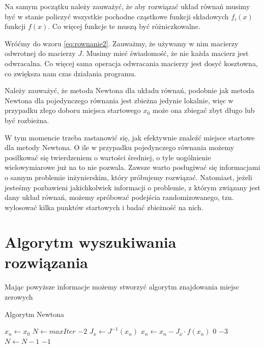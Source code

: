 \documentclass{article}
\begin{document}
    Na samym początku należy zauważyć, że aby rozwiązać układ równań musimy być w stanie
    policzyć wszystkie pochodne cząstkowe funkcji składowych $f_i(x)$ funkcji $f(x)$. Co więcej
    funkcje te muszą być różniczkowalne.

    Wróćmy do wzoru \eqref{eq:rownanie2}. Zauważmy, że używamy w nim macierzy odwrotnej
    do macierzy $J$. Musimy mieć świadomość, że nie każda macierz jest odwracalna.
    Co więcej sama operacja odwracania macierzy jest dosyć kosztowna, co zwiększa
    nam czas działania programu.

    Należy zauważyć, że metoda Newtona dla układu równań, podobnie jak
    metoda Newtona dla pojedynczego równania jest zbieżna jedynie lokalnie, więc
    w przypadku złego doboru miejsca startowego $x_0$ może ona zbiegać zbyt długo
    lub być rozbieżna.

    W tym momencie trzeba zastanowić się, jak efektywnie znaleźć miejsce startowe
    dla metody Newtona. O ile w przypadku pojedynczego równania możemy posiłkować
    się twierdzeniem o wartości średniej, o tyle uogólnienie wielowymiarowe już
    na to nie pozwala. Zawsze warto posługiwać się informacjami o samym problemie
    inżynierskim, który próbujemy rozwiązać. Natomiast, jeżeli jesteśmy pozbawieni
    jakichkolwiek informacji o problemie, z którym związany jest dany układ równań,
    możemy spróbować podejścia randomizowanego, tzn. wylosować kilka punktów startowych
    i badać zbieżność na nich.

  \section{Algorytm wyszukiwania rozwiązania}
    \paragraph{} Mając powyższe informacje możemy stworzyć algorytm znajdowania miejsc zerowych

    \begin{algorithm}
    \caption{Algorytm Newtona}\label{alg:newton}
      \begin{algorithmic}[1]
        \State $x_n\gets x_0$
        \State $N\gets maxIter$
            \State \Return $-2$
          \EndIf
          \State $J_{x}\gets J^{-1}(x_n)$
          \State $x_n\gets x_n-J_{x}\cdot f(x_n)$
            \State \Return $0$
          \EndIf
            \State \Return $-3$
          \EndIf
          \State $N \gets N - 1$
        \EndWhile
        \State \Return $-1$
        \EndProcedure
      \end{algorithmic}
    \end{algorithm}
\end{document}
